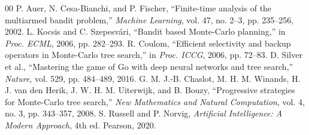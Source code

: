 \documentclass[conference]{IEEEtran}
\begin{document}
\begin{thebibliography}{00}
 P. Auer, N. Cesa-Bianchi, and P. Fischer, ``Finite-time analysis of the multiarmed bandit problem,'' \emph{Machine Learning}, vol. 47, no. 2--3, pp. 235--256, 2002.
 L. Kocsis and C. Szepesv\'ari, ``Bandit based Monte-Carlo planning,'' in \emph{Proc. ECML}, 2006, pp. 282--293.
 R. Coulom, ``Efficient selectivity and backup operators in Monte-Carlo tree search,'' in \emph{Proc. ICCG}, 2006, pp. 72--83.
 D. Silver et al., ``Mastering the game of Go with deep neural networks and tree search,'' \emph{Nature}, vol. 529, pp. 484--489, 2016.
 G. M. J.-B. Chaslot, M. H. M. Winands, H. J. van den Herik, J. W. H. M. Uiterwijk, and B. Bouzy, ``Progressive strategies for Monte-Carlo tree search,'' \emph{New Mathematics and Natural Computation}, vol. 4, no. 3, pp. 343--357, 2008.
 S. Russell and P. Norvig, \emph{Artificial Intelligence: A Modern Approach}, 4th ed. Pearson, 2020.
\end{thebibliography}
\end{document}
